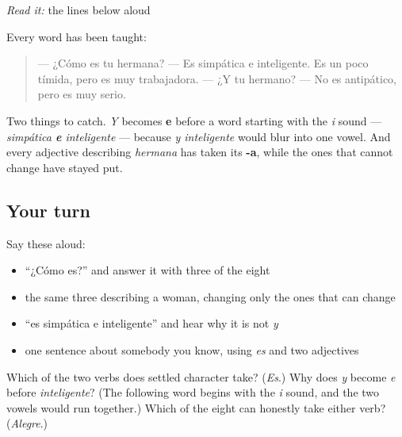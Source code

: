 \begin{tcolorbox}[breakable,skin=enhanced,colback=orange!6,colframe=orange!45!black,boxrule=0.5pt,arc=1mm,left=6pt,right=6pt,top=4pt,bottom=4pt,fonttitle=\bfseries,title={Read this}]
\emph{Read it:} the lines below aloud

Every word has been taught:

\begin{quote}
— ¿Cómo es tu hermana? — Es simpática e inteligente. Es un poco tímida, pero es muy trabajadora. — ¿Y tu hermano? — No es antipático, pero es muy serio.
\end{quote}

Two things to catch. \emph{Y} becomes \textbf{e} before a word starting with the \emph{i} sound — \emph{simpática \textbf{e} inteligente} — because \emph{y inteligente} would blur into one vowel. And every adjective describing \emph{hermana} has taken its \textbf{-a}, while the ones that cannot change have stayed put.
\end{tcolorbox}

\subsection*{Your turn}
Say these aloud:

\begin{itemize}
\raggedright
  \item \textquotedblleft{}¿Cómo es?\textquotedblright{} and answer it with three of the eight
  \item the same three describing a woman, changing only the ones that can change
  \item \textquotedblleft{}es simpática e inteligente\textquotedblright{} and hear why it is not \emph{y}
  \item one sentence about somebody you know, using \emph{es} and two adjectives
\end{itemize}

\begin{tcolorbox}[breakable,colback=teal!4,colframe=teal!35!black,title={Before you move on}]
Which of the two verbs does settled character take? (\emph{Es}.) Why does \emph{y} become \emph{e} before \emph{inteligente}? (The following word begins with the \emph{i} sound, and the two vowels would run together.) Which of the eight can honestly take either verb? (\emph{Alegre}.)
\end{tcolorbox}
